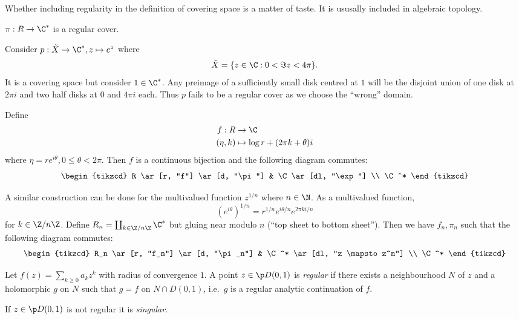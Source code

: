 \documentclass[a4paper]{article}
\begin{document}
\begin{note}
  Whether including regularity in the definition of covering space is a matter of taste. It is ususally included in algebraic topology.
\end{note}

\begin{remark}
  \(\pi: R \to \C^*\) is a regular cover.
\end{remark}

\begin{eg}
  Consider \(p: \tilde X \to \C^*, z \mapsto e^z\) where
  \[
    \tilde X = \{z \in \C: 0 < \Im z < 4\pi\}.
  \]
  It is a covering space but consider \(1 \in \C^*\). Any preimage of a sufficiently small disk centred at \(1\) will be the disjoint union of one disk at \(2\pi i\) and two half disks at \(0\) and \(4\pi i\) each. Thus \(p\) fails to be a regular cover as we choose the ``wrong'' domain.
\end{eg}

Define
\begin{align*}
  f: R &\to \C \\
  (\eta, k) &\mapsto \log r + (2\pi k + \theta) i
\end{align*}
where \(\eta = re^{i\theta}, 0 \leq \theta < 2\pi\). Then \(f\) is a continuous bijection and the following diagram commutes:
\[
  \begin{tikzcd}
    R \ar[r, "f"] \ar[d, "\pi"] & \C \ar[dl, "\exp"] \\
    \C^*
  \end{tikzcd}
\]

A similar construction can be done for the multivalued function \(z^{1/n}\) where \(n \in \N\). As a multivalued function,
\[
  (e^{i\theta})^{1/n} = r^{1/n} e^{i\theta/n} e^{2\pi ki/n}
\]
for \(k \in \Z/n\Z\). Define \(R_n = \coprod_{k \in \Z/n\Z} \C^*\) but gluing near modulo \(n\) (``top sheet to bottom sheet''). Then we have \(f_n, \pi_n\) such that the following diagram commutes:
\[
  \begin{tikzcd}
    R_n \ar[r, "f_n"] \ar[d, "\pi_n"] & \C^* \ar[dl, "z \mapsto z^n"] \\
    \C^*
  \end{tikzcd}
\]

\begin{definition}
  Let \(f(z) = \sum_{k \geq 0} a_k z^k\) with radius of convergence \(1\). A point \(z \in \p D(0, 1)\) is \emph{regular} if there exists a neighbourhood \(N\) of \(z\) and a holomorphic \(g\) on \(N\) such that \(g = f\) on \(N \cap D(0, 1)\), i.e.\ \(g\) is a regular analytic continuation of \(f\).

  If \(z \in \p D(0, 1)\) is not regular it is \emph{singular}.
\end{definition}
\end{document}
